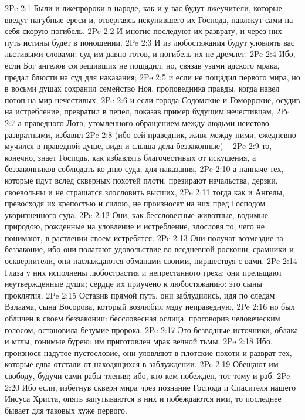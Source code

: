 2Pe 2:1  Были и лжепророки в народе, как и у вас будут лжеучители, которые введут пагубные ереси и, отвергаясь искупившего их Господа, навлекут сами на себя скорую погибель.
2Pe 2:2  И многие последуют их разврату, и через них путь истины будет в поношении.
2Pe 2:3  И из любостяжания будут уловлять вас льстивыми словами; суд им давно готов, и погибель их не дремлет.
2Pe 2:4  Ибо, если Бог ангелов согрешивших не пощадил, но, связав узами адского мрака, предал блюсти на суд для наказания;
2Pe 2:5  и если не пощадил первого мира, но в восьми душах сохранил семейство Ноя, проповедника правды, когда навел потоп на мир нечестивых;
2Pe 2:6  и если города Содомские и Гоморрские, осудив на истребление, превратил в пепел, показав пример будущим нечестивцам,
2Pe 2:7  а праведного Лота, утомленного обращением между людьми неистово развратными, избавил
2Pe 2:8  (ибо сей праведник, живя между ними, ежедневно мучился в праведной душе, видя и слыша дела беззаконные) --
2Pe 2:9  то, конечно, знает Господь, как избавлять благочестивых от искушения, а беззаконников соблюдать ко дню суда, для наказания,
2Pe 2:10  а наипаче тех, которые идут вслед скверных похотей плоти, презирают начальства, дерзки, своевольны и не страшатся злословить высших,
2Pe 2:11  тогда как и Ангелы, превосходя их крепостью и силою, не произносят на них пред Господом укоризненного суда.
2Pe 2:12  Они, как бессловесные животные, водимые природою, рожденные на уловление и истребление, злословя то, чего не понимают, в растлении своем истребятся.
2Pe 2:13  Они получат возмездие за беззаконие, ибо они полагают удовольствие во вседневной роскоши; срамники и осквернители, они наслаждаются обманами своими, пиршествуя с вами.
2Pe 2:14  Глаза у них исполнены любострастия и непрестанного греха; они прельщают неутвержденные души; сердце их приучено к любостяжанию: это сыны проклятия.
2Pe 2:15  Оставив прямой путь, они заблудились, идя по следам Валаама, сына Восорова, который возлюбил мзду неправедную,
2Pe 2:16  но был обличен в своем беззаконии: бессловесная ослица, проговорив человеческим голосом, остановила безумие пророка.
2Pe 2:17  Это безводные источники, облака и мглы, гонимые бурею: им приготовлен мрак вечной тьмы.
2Pe 2:18  Ибо, произнося надутое пустословие, они уловляют в плотские похоти и разврат тех, которые едва отстали от находящихся в заблуждении.
2Pe 2:19  Обещают им свободу, будучи сами рабы тления; ибо, кто кем побежден, тот тому и раб.
2Pe 2:20  Ибо если, избегнув скверн мира чрез познание Господа и Спасителя нашего Иисуса Христа, опять запутываются в них и побеждаются ими, то последнее бывает для таковых хуже первого.
